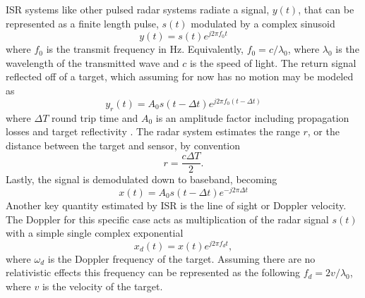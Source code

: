 ISR systems like other pulsed radar systems radiate a signal, $y(t)$, that can be represented as a finite length pulse, $s(t)$ modulated by a complex sinusoid
\begin{equation}
\label{eqn:sigone}
y(t)=s(t)e^{j2\pi f_0 t}
\end{equation}
where $f_0$ is the transmit frequency in Hz. Equivalently, $ f_0=c/\lambda_0$, where $\lambda_0$ is the wavelength of the transmitted wave and $c$ is the speed of light. The return signal reflected off of a target, which assuming for now has no motion may be modeled as
\begin{equation}
\label{eqn:sigone}
y_r(t)=A_0s(t-\Delta t)e^{j2\pi f_0 (t-\Delta t)}
\end{equation}
where $\Delta T$ round trip time and $A_0$ is an amplitude factor including propagation losses and target reflectivity \cite{richards2014fundamentals}. The radar system estimates the range $r$, or the distance between the target and sensor, by convention
\begin{equation}
\label{eqn:range_intro}
r=\frac{c\Delta T}{2}.
\end{equation}
Lastly, the signal is demodulated down to baseband, becoming
\begin{equation}
\label{eqn:baseband}
x(t)=A_0s(t-\Delta t)e^{-j2\pi\Delta t}
\end{equation}
Another key quantity estimated by ISR is the line of sight or Doppler velocity. The Doppler for this specific case acts as multiplication of the radar signal $s(t)$ with a simple single complex exponential
\begin{equation}
\label{simpledop}
x_d(t) = x(t)e^{j2\pi f_d t},
\end{equation}
 where $\omega_d$ is the Doppler frequency of the target. Assuming there are no relativistic effects this frequency can be represented as the following $f_d = 2v/\lambda_0 $, where $v$ is the velocity of the target. 

